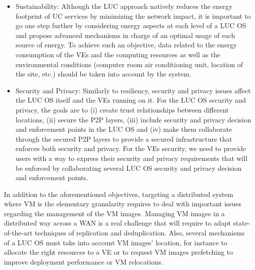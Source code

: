 \begin{itemize}
\item Sustainability: Although the LUC approach natively reduces the energy
footprint of UC services by minimizing the network impact, 
it is important to go one
step further by considering energy aspects at each level of a LUC OS
and propose advanced mechanisms in charge of an optimal usage of each source of energy. 
 To achieve such an objective, data related to the energy
  consumption of the VEs  and the computing resources
  as well as the environmental conditions (computer room air conditioning unit, location of the
  site, etc.) should be taken into account by the system.
\item Security and Privacy: Similarly to resiliency, security and privacy issues affect the LUC OS itself and the VEs running on it.
For the LUC OS security and privacy, the goals are to (i) create trust relationships between
different locations, (ii) secure the P2P layers, 
(iii) include security and privacy decision and enforcement points in the LUC OS and (iv) make them collaborate through the secured P2P layers to provide a secured infrastructure that enforces both security and privacy.
For the VEs security, we need to provide users with a way to express their security and privacy requirements that will be enforced by collaborating 
several LUC OS security and privacy decision and enforcement points.


\end{itemize}

In addition to the aforementioned objectives, targeting a distributed system
where VM is the elementary granularity requires to deal with important issues
regarding the management of the VM images. Managing VM images in a distributed
way across a WAN is a real challenge that will require to adapt
state-of-the-art techniques of replication and deduplication. Also,
several mechanisms of a LUC OS must take into account VM images'
location, for instance to allocate the right resources to a VE  or to request
VM images prefetching to improve deployment performance or VM relocations.

